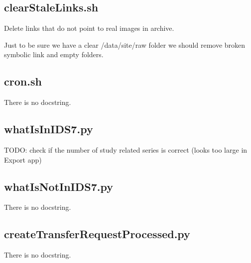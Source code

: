 \documentclass[letterpaper,10pt,english]{sphinxmanual}
\begin{document}
\subsection{clearStaleLinks.sh}
\label{\detokenize{Architecture/scripts/clearStaleLinks:clearstalelinks-sh}}\label{\detokenize{Architecture/scripts/clearStaleLinks::doc}}
\sphinxAtStartPar
Delete links that do not point to real images in archive.

\sphinxAtStartPar
Just to be sure we have a clear /data/site/raw folder we should remove broken symbolic link and empty folders.

\sphinxstepscope


\subsection{cron.sh}
\label{\detokenize{Architecture/scripts/cron:cron-sh}}\label{\detokenize{Architecture/scripts/cron::doc}}
\sphinxAtStartPar
There is no docstring.

\sphinxstepscope


\subsection{whatIsInIDS7.py}
\label{\detokenize{Architecture/scripts/whatIsInIDS7:whatisinids7-py}}\label{\detokenize{Architecture/scripts/whatIsInIDS7::doc}}
\sphinxAtStartPar
TODO: check if the number of study related series is correct (looks too large in Export app)

\sphinxstepscope


\subsection{whatIsNotInIDS7.py}
\label{\detokenize{Architecture/scripts/whatIsNotInIDS7:whatisnotinids7-py}}\label{\detokenize{Architecture/scripts/whatIsNotInIDS7::doc}}
\sphinxAtStartPar
There is no docstring.

\sphinxstepscope


\subsection{createTransferRequestProcessed.py}
\label{\detokenize{Architecture/scripts/createTransferRequestForProcessed:createtransferrequestprocessed-py}}\label{\detokenize{Architecture/scripts/createTransferRequestForProcessed::doc}}
\sphinxAtStartPar
There is no docstring.

\sphinxstepscope
\end{document}
